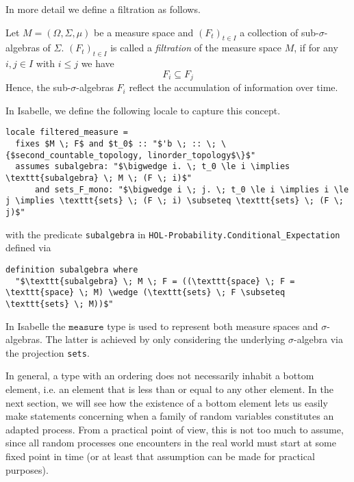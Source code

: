 In more detail we define a filtration as follows. 
\begin{definition}
	Let $M = (\Omega, \Sigma, \mu)$ be a measure space and $(F_t)_{t \in I}$ a collection of sub-$\sigma$-algebras of $\Sigma$. $(F_t)_{t \in I}$ is called a \textit{filtration} of the measure space $M$, if for any $i, j\in I$ with $i \le j$ we have 
	\[
		F_i \subseteq F_j
	\]
	Hence, the sub-$\sigma$-algebras $F_i$ reflect the accumulation of information over time.
\end{definition}

In Isabelle, we define the following locale to capture this concept.

\begin{isadefinition}
{\small
\begin{lstlisting}[style=isabelle]
locale filtered_measure = 
  fixes $M \; F$ and $t_0$ :: "$'b \; :: \; \{$second_countable_topology, linorder_topology$\}$"
  assumes subalgebra: "$\bigwedge i. \; t_0 \le i \implies \texttt{subalgebra} \; M \; (F \; i)$"
      and sets_F_mono: "$\bigwedge i \; j. \; t_0 \le i \implies i \le j \implies \texttt{sets} \; (F \; i) \subseteq \texttt{sets} \; (F \; j)$"
\end{lstlisting}

with the predicate \texttt{subalgebra} in \texttt{HOL-Probability.Conditional\_Expectation} defined via

\begin{lstlisting}[style=isabelle]
definition subalgebra where
  "$\texttt{subalgebra} \; M \; F = ((\texttt{space} \; F = \texttt{space} \; M) \wedge (\texttt{sets} \; F \subseteq \texttt{sets} \; M))$"
  \end{lstlisting}
}
\end{isadefinition}

\begin{remark}
	In Isabelle the $\texttt{measure}$ type is used to represent both measure spaces and $\sigma$-algebras. The latter is achieved by only considering the underlying $\sigma$-algebra via the projection \texttt{sets}.
\end{remark}

In general, a type with an ordering does not necessarily inhabit a bottom element, i.e. an element that is less than or equal to any other element. In the next section, we will see how the existence of a bottom element lets us easily make statements concerning when a family of random variables constitutes an adapted process. From a practical point of view, this is not too much to assume, since all random processes one encounters in the real world must start at some fixed point in time (or at least that assumption can be made for practical purposes).

